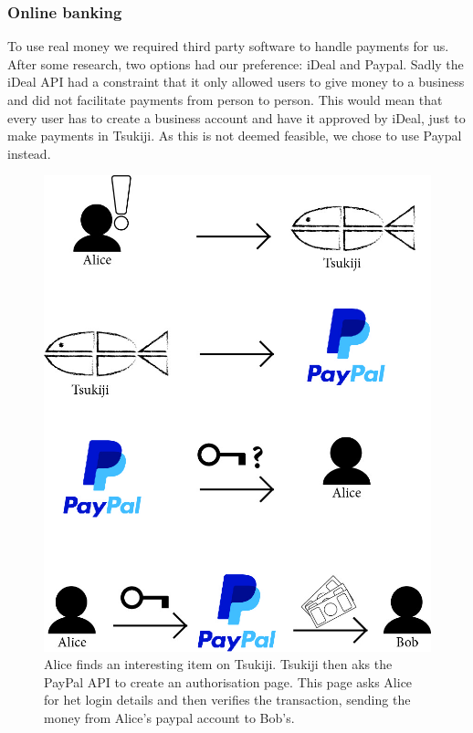 \subsubsection{Online banking}
To use real money we required third party software to handle payments for us. 
After some research, two options had our preference: iDeal and Paypal.
Sadly the iDeal API had a constraint that it only allowed users to give money to a business and did not facilitate payments from person to person.
This would mean that every user has to create a business account and have it approved by iDeal, just to make payments in Tsukiji.
As this is not deemed feasible, we chose to use Paypal instead.
\begin{figure}[H]
  \centering
  \includegraphics[width=\linewidth]{paypal-payment}
  \caption{Alice finds an interesting item on Tsukiji. Tsukiji then aks the PayPal API to create an authorisation page. This page asks Alice for het login details and then verifies the transaction, sending the money from Alice's paypal account to Bob's.}
  \label{paypal_pay}
\end{figure}

